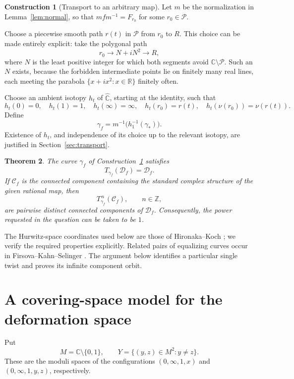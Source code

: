 \documentclass[11pt]{article}
\newcommand{\C}{\mathbb C}
\newcommand{\Z}{\mathbb Z}
\newcommand{\Sphere}{\widehat{\mathbb C}}
\newcommand{\Def}{\mathcal D}
\newcommand{\Par}{\mathcal P}
\newtheorem{theorem}{Theorem}[section]
\theoremstyle{definition}
\newtheorem{construction}[theorem]{Construction}
\theoremstyle{remark}
\begin{document}
\begin{construction}[Transport to an arbitrary map]\label{con:general}
Let $m$ be the normalization in Lemma~\ref{lem:normal}, so that
$mfm^{-1}=F_{r_0}$ for some $r_0\in\Par$.

Choose a piecewise smooth path $r(t)$ in $\Par$ from $r_0$ to $R$.
This choice can be made entirely explicit: take the polygonal path
\[
r_0\longrightarrow N+iN^2\longrightarrow R,
\]
where $N$ is the least positive integer for which both segments avoid
$\C\setminus\Par$.  Such an $N$ exists, because the forbidden
intermediate points lie on finitely many real lines, each meeting
the parabola $\{x+ix^2:x\in\mathbb R\}$ finitely often.

Choose an ambient isotopy $h_t$ of $\Sphere$, starting at the identity,
such that
\[
h_t(0)=0,\quad h_t(1)=1,\quad h_t(\infty)=\infty,\quad
h_t(r_0)=r(t),\quad h_t(\nu(r_0))=\nu(r(t)).
\]
Define
\begin{equation}\label{eq:generalcurve}
\boxed{\ \gamma_f=m^{-1}\bigl(h_1^{-1}(\gamma_*)\bigr).\ }
\end{equation}
Existence of $h_t$, and independence of its choice up to the relevant
isotopy, are justified in Section~\ref{sec:transport}.
\end{construction}

\begin{theorem}\label{thm:main}
The curve $\gamma_f$ of Construction~\ref{con:general} satisfies
\[
T_{\gamma_f}(\Def_f)=\Def_f.
\]
If $\mathcal C_f$ is the connected component containing the standard
complex structure of the given rational map, then
\[
T_{\gamma_f}^{\,n}(\mathcal C_f),\qquad n\in\Z,
\]
are pairwise distinct connected components of $\Def_f$.
Consequently, the power requested in the question can be taken to be
$1$.
\end{theorem}

The Hurwitz-space coordinates used below are those of
Hironaka--Koch \cite[Proposition~3.1]{HK}; we verify the required
properties explicitly.  Related pairs of equalizing curves occur in
Firsova--Kahn--Selinger \cite[Section~9, case~(12b), arXiv version]{FKS}.
The argument below identifies a particular single twist and proves
its infinite component orbit.

\section{A covering-space model for the deformation space}

Put
\[
M=\C\setminus\{0,1\},\qquad
Y=\{(y,z)\in M^2:y\ne z\}.
\]
These are the moduli spaces of the configurations
$(0,\infty,1,x)$ and $(0,\infty,1,y,z)$, respectively.
\end{document}

